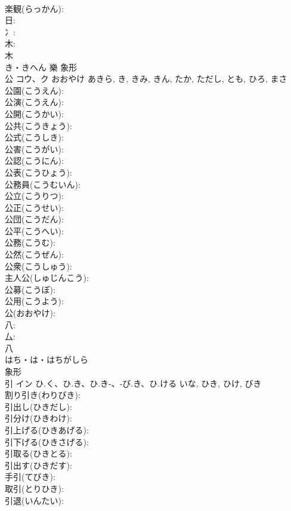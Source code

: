 \documentclass[8pt]{extreport}
\begin{document}
\begin{CJK}{UTF8}{min}
\\	楽観(らっかん): 
\\	日: 
\\	冫: 
\\	木: 
\\	木	
\\	き・きへん	樂	象形 
\\	公	コウ、ク	おおやけ	あきら, き, きみ, きん, たか, ただし, とも, ひろ, まさ	
\\	公園(こうえん): 
\\	公演(こうえん): 
\\	公開(こうかい): 
\\	公共(こうきょう): 
\\	公式(こうしき): 
\\	公害(こうがい): 
\\	公認(こうにん): 
\\	公表(こうひょう): 
\\	公務員(こうむいん): 
\\	公立(こうりつ): 
\\	公正(こうせい): 
\\	公団(こうだん): 
\\	公平(こうへい): 
\\	公務(こうむ): 
\\	公然(こうぜん): 
\\	公衆(こうしゅう): 
\\	主人公(しゅじんこう): 
\\	公募(こうぼ): 
\\	公用(こうよう): 
\\	公(おおやけ): 
\\	八: 
\\	厶: 
\\	八	
\\	はち・は・はちがしら	
\\	象形 
\\	引	イン	ひ.く、ひ.き、ひ.き-、-び.き、ひ.ける	いな, ひき, ひけ, びき	
\\	割り引き(わりびき): 
\\	引出し(ひきだし): 
\\	引分け(ひきわけ): 
\\	引上げる(ひきあげる): 
\\	引下げる(ひきさげる): 
\\	引取る(ひきとる): 
\\	引出す(ひきだす): 
\\	手引(てびき): 
\\	取引(とりひき): 
\\	引退(いんたい): 

\end{CJK}
\end{document}
